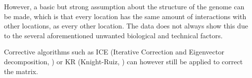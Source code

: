 However, a basic but strong assumption about the structure of the genome can be
made, which is that every location has the same amount of interactions with
other locations, as every other location. The data does not always show this due to
the several aforementioned unwanted biological and technical factors.

Corrective algorithms such as ICE \cite{imakaev2012iterative} (Iterative Correction and Eigenvector
decomposition, ) or KR \cite{knight2013fast} (Knight-Ruiz,
) can however still be applied to correct the matrix.



%
%
%
%
%
%



